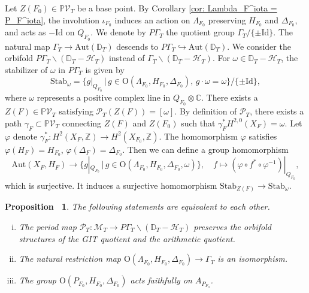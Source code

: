 \documentclass[12pt,reqno,a4paper]{amsart}
\newtheorem{prop}[thm]{Proposition~}
\theoremstyle{remark}
\theoremstyle{definition}
\newcommand{\CC}{\mathbb{C}}
\newcommand{\ZZ}{\mathbb{Z}}
\newcommand{\PP}{\mathbb{P}}
\newcommand{\DD}{\mathbb{D}}
\newcommand{\Prd}{\mathscr{P}}
\newcommand{\calH}{\mathcal{H}}
\newcommand{\calM}{\mathcal{M}}
\newcommand{\calV}{\mathcal{V}}
\newcommand\Aut{\mathrm{Aut}}
\newcommand\Id{\mathrm{Id}}
\newcommand\Or{\mathrm{O}}
\newcommand\Stab{\mathrm{Stab}}
\newcommand{\bs}{\backslash}
\newcommand{\red}{\textcolor{red}}
\begin{document}
Let $Z(F_0)\in\PP\calV_T$ be a base point.
By Corollary \ref{cor: Lambda_F^iota = P_F^iota}, the involution $\iota_{F_0}$ induces an action on $\Lambda_{F_0}$ preserving $H_{F_0}$ and $\Delta_{F_0}$, and acts as $-\Id$ on $Q_{F_0}$.
We denote by $P\Gamma_T$ the quotient group $\Gamma_T/\{\pm \Id\}$. The natural map $\Gamma_T \to \Aut(\DD_T)$ descends to $P\Gamma_T \hookrightarrow \Aut(\DD_T)$.  
We consider the orbifold $P\Gamma_T\bs(\DD_T-\calH_T)$ instead of $\Gamma_T\bs(\DD_T-\calH_T)$.
For $\omega\in \DD_T-\calH_T$, the stabilizer of $\omega$ in $P\Gamma_T$ is given by
\begin{equation*}
    \Stab_\omega = \{ g|_{Q_{F_0}} \,\big|\, g\in \Or(\Lambda_{F_0},H_{F_0},\Delta_{F_0}),\, g\cdot\omega=\omega \}/\{\pm \Id\},
\end{equation*}
where $\omega$ represents a positive complex line in $Q_{F_0}\otimes\CC$.
There exists a $Z(F)\in \PP\calV_T$ satisfying $\Prd_T(Z(F))=[\omega]$.
By definition of $\Prd_T$, there exists a path $\gamma_F\subset\PP\calV_T$ connecting $Z(F)$ and $Z(F_0)$ such that $\gamma_F^*H^{2,0}(X_F)=\omega$.
Let $\varphi$ denote $\gamma_F^*\colon H^2(X_F,\ZZ)\to H^2(X_{F_0},\ZZ)$.
The homomorphism $\varphi$ satisfies $\varphi(H_F)=H_{F_0}$, $\varphi(\Delta_F)=\Delta_{F_0}$.
Then we can define a group homomorphism
\begin{equation*}
    \Aut(X_F,H_F) \to \{ g|_{Q_{F_0}} \,\big|\, g\in \Or(\Lambda_{F_0},H_{F_0},\Delta_{F_0},\omega) \},\quad f \mapsto (\varphi\circ f^*\circ\varphi^{-1})|_{Q_{F_0}},
\end{equation*}
which is surjective.
It induces a surjective homomorphism $\Stab_{Z(F)}\to\Stab_\omega$.
\begin{prop}
\label{prop: orbifold criterion}
    The following statements are equivalent to each other.
    \begin{enumerate}[(i)]
        \item The period map $\Prd_T\colon \calM_T\to P\Gamma_T\bs(\DD_T-\calH_T)$ preserves the orbifold structures of the GIT quotient and the arithmetic quotient.
        \item %
        The natural restriction map $\Or(\Lambda_{F_0},H_{F_0},\Delta_{F_0})\to \Gamma_T$ is an isomorphism.
        \item The group $\Or(P_{F_0},H_{F_0},\Delta_{F_0})$ acts faithfully on $A_{P_{F_0}}$.
    \end{enumerate}
\end{prop}
\end{document}
